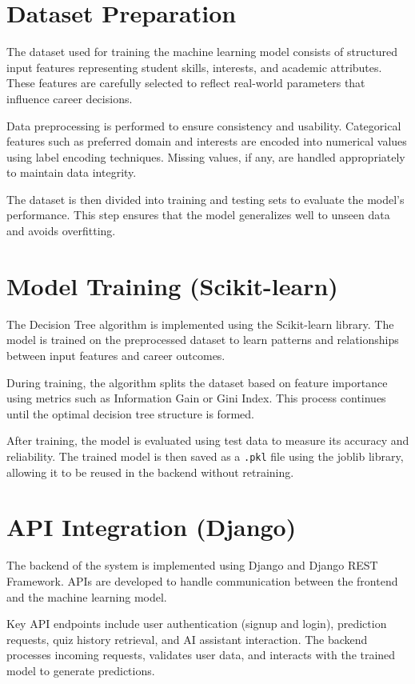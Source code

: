\documentclass[12pt,a4paper]{report}
\begin{document}
{\section{Dataset Preparation}

The dataset used for training the machine learning model consists of structured input features representing student skills, interests, and academic attributes. These features are carefully selected to reflect real-world parameters that influence career decisions.

Data preprocessing is performed to ensure consistency and usability. Categorical features such as preferred domain and interests are encoded into numerical values using label encoding techniques. Missing values, if any, are handled appropriately to maintain data integrity.

The dataset is then divided into training and testing sets to evaluate the model's performance. This step ensures that the model generalizes well to unseen data and avoids overfitting.

\section{Model Training (Scikit-learn)}

The Decision Tree algorithm is implemented using the Scikit-learn library. The model is trained on the preprocessed dataset to learn patterns and relationships between input features and career outcomes.

During training, the algorithm splits the dataset based on feature importance using metrics such as Information Gain or Gini Index. This process continues until the optimal decision tree structure is formed.

After training, the model is evaluated using test data to measure its accuracy and reliability. The trained model is then saved as a \texttt{.pkl} file using the joblib library, allowing it to be reused in the backend without retraining.

\section{API Integration (Django)}

The backend of the system is implemented using Django and Django REST Framework. APIs are developed to handle communication between the frontend and the machine learning model.

Key API endpoints include user authentication (signup and login), prediction requests, quiz history retrieval, and AI assistant interaction. The backend processes incoming requests, validates user data, and interacts with the trained model to generate predictions.

}
\end{document}
